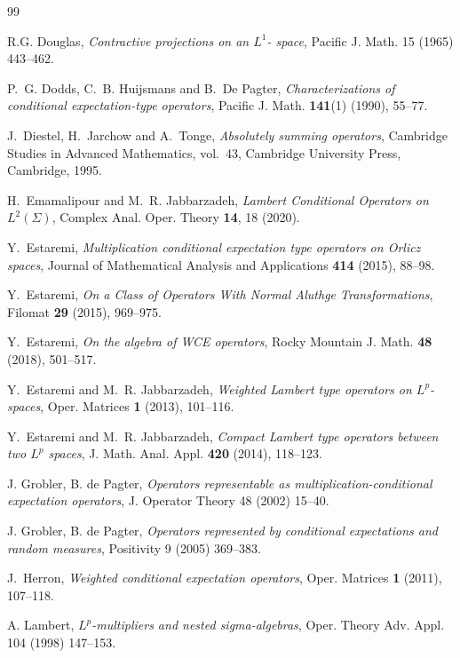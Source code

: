 \documentclass{amsart}
\theoremstyle{definition}\newtheorem{defn}[thm]{Definition}
\theoremstyle{remark}
\numberwithin{equation}{section}
\begin{document}
\begin{thebibliography}{99}


 R.G. Douglas, \emph{Contractive projections on an $L^1$- space}, Pacific J. Math. 15 (1965) 443–462.

P.~G. Dodds, C.~B. Huijsmans and B.~De Pagter,
\emph{Characterizations of conditional expectation-type operators},
Pacific J. Math. \textbf{141}(1) (1990), 55--77.

J.~Diestel, H.~Jarchow and A.~Tonge,
\emph{Absolutely summing operators},
Cambridge Studies in Advanced Mathematics, vol.~43, Cambridge University Press, Cambridge, 1995.

H.~Emamalipour and M.~R. Jabbarzadeh,
\emph{Lambert Conditional Operators on $L^2(\Sigma)$},
Complex Anal. Oper. Theory \textbf{14}, 18 (2020).

Y.~Estaremi,
\emph{Multiplication conditional expectation type operators on Orlicz spaces},
Journal of Mathematical Analysis and Applications \textbf{414} (2015), 88--98.

Y.~Estaremi,
\emph{On a Class of Operators With Normal Aluthge Transformations},
Filomat \textbf{29} (2015), 969--975.

Y.~Estaremi,
\emph{On the algebra of WCE operators},
Rocky Mountain J. Math. \textbf{48} (2018), 501--517.

Y.~Estaremi and M.~R. Jabbarzadeh,
\emph{Weighted Lambert type operators on $L^p$-spaces},
Oper. Matrices \textbf{1} (2013), 101--116.

Y.~Estaremi and M.~R. Jabbarzadeh,
\emph{Compact Lambert type operators between two $L^p$ spaces},
J. Math. Anal. Appl. \textbf{420} (2014), 118--123.

 J. Grobler, B. de Pagter, \emph{Operators representable as multiplication-conditional expectation operators}, J. Operator Theory
48 (2002) 15–40.

 J. Grobler, B. de Pagter, \emph{Operators represented by conditional expectations and random measures}, Positivity 9 (2005)
369–383. 

J.~Herron,
\emph{Weighted conditional expectation operators},
Oper. Matrices \textbf{1} (2011), 107--118.

 A. Lambert, \emph{$L^p$-multipliers and nested sigma-algebras}, Oper. Theory Adv. Appl. 104 (1998) 147–153.


\end{thebibliography}
\end{document}
